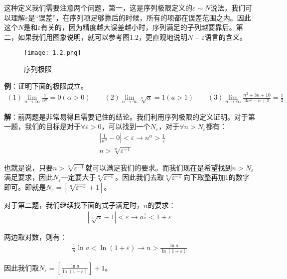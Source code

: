 \documentclass{ctexart}
\let\oldtextbf\textbf %
\renewcommand{\textbf}[1]{\textcolor{btex}{\oldtextbf{#1}}} %
\begin{document}
这种定义我们需要注意两个问题，第一，这是序列极限定义的$\varepsilon\sim N$说法，我们可以理解$\varepsilon$是“误差”，在序列项足够靠后的时候，所有的项都在误差范围之内。因此这个$N$是和$\varepsilon$有关的，因为精度越大误差越小时，序列满足的子列越要靠后。第二，如果我们用图象说明，就可以参考图1.2，更直观地说明$N-\varepsilon$语言的含义。
\begin{figure}[H]    
\centering     
\renewcommand{\figurename}{图}     
\renewcommand{\thefigure}{1.2}    
\begin{myimagebox}[width=0.45\textwidth] %
\texttt{[image: 1.2.png]} %
\end{myimagebox}     
\caption{\label{fig:1.2}序列极限}   
\end{figure}

\textbf{\color{btex}例}：证明下面的极限成立。
\begin{align*}
   (1)\lim_{n\to \infty}\frac{1}{n^\alpha}=0 (\alpha>0) \qquad(2)\lim_{n\to\infty}\sqrt[n]{a}=1(a>1)\qquad (3)\lim_{n\to\infty}\frac{n^2+3n+10}{3n^2-n+2}=\frac{1}{3} 
\end{align*}

\textbf{\color{btex}解}：前两题是非常易得且需要记住的结论。我们利用序列极限的定义证明。对于第一题，我们的目标是对于$\forall \varepsilon>0$，可以找到一个$N_\varepsilon$，对于$\forall n>N_\varepsilon$都有：
\begin{align*}
    &|\frac{1}{n^\alpha}-0|<\varepsilon\to n^\alpha>\frac{1}{\varepsilon}\\
    & n>\sqrt[n]{\varepsilon^{-1}}
\end{align*}

也就是说，只要$n>\sqrt[n]{\varepsilon^{-1}}$就可以满足我们的要求。而我们现在是希望找到$n>N_\varepsilon$满足要求，因此$N_\varepsilon$一定要大于$\sqrt[n]{\varepsilon^{-1}}$。因此我们去取$\sqrt[n]{\varepsilon^{-1}}$向下取整再加1的数字即可。即就是$N_\varepsilon=[\sqrt[n]{\varepsilon^{-1}}+1]$。

对于第二题，我们继续找下面的式子满足时，$n$的要求：
\begin{align*}
    |\sqrt[n]{a}-1|<\varepsilon\to  a^{\frac{1}{n}}<1+\varepsilon
\end{align*}

两边取对数，则有：
\begin{align*}
    \frac{1}{n}\ln a<\ln(1+\varepsilon)\to n>\frac{\ln a}{\ln(1+\varepsilon)}
\end{align*}

因此我们取$N_\varepsilon=[\frac{\ln a}{\ln(1+\varepsilon)}]+1$。
\end{document}
